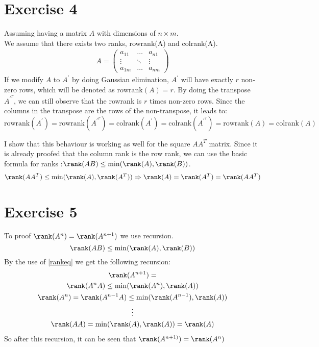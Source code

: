 \section{Exercise 4}
Assuming having a matrix $A$ with dimensions of $n\times m$.\\
We assume that there exists two ranks, rowrank(A) and colrank(A).
\begin{gather*}
A = \left( \begin{array}{ccc}
a_{11} & \hdots & a_{n1} \\
\vdots & \ddots & \vdots \\
a_{1m} & \hdots & a_{nm}
\end{array} \right)
\end{gather*}
If we modify $A$ to $A^{'}$ by doing Gaussian elimination, $A^{'}$ will have exactly $r$ non-zero rows, which will be denoted as $\text{rowrank}(A) = r$. 
By doing the transpose $A^{{'}^T}$, we can still observe that the rowrank is $r$ times non-zero rows. Since the columns in the transpose are the rows of the non-transpose, it leads to:
\begin{equation*}
\text{rowrank}(A^{'}) = \text{rowrank}(A^{{'}^T}) = \text{colrank}(A^{'}) = \text{colrank}(A^{{'}^T}) = \text{rowrank}(A) = \text{colrank} (A)
\end{equation*}

I show that this behaviour is working as well for the square $AA^T$ matrix. Since it is already proofed that the column rank is the row rank, we can use the basic formula for ranks :$\rank(AB) \leq \min(\rank (A), \rank(B))$.
\begin{equation}
\rank(A A^T) \leq \min( \rank (A) , \rank (A^T)) \Rightarrow \rank (A)=\rank (A^T)= \rank (A A^T)
\end{equation}

\section{Exercise 5}
To proof $\rank (A^n) = \rank (A^{n+1})$  we use recursion. 
\begin{equation}
\label{rankeq}
\rank (AB) \leq \min (\rank (A), \rank (B))
\end{equation}
By the use of \ref{rankeq} we get the following recursion:
\begin{gather*}
\rank (A^{n+1}) = \\ 
\rank (A^{n} A) \leq \min ( \rank (A^n), \rank(A) ) \\
\rank (A^n) = \rank (A^{n-1} A) \leq \min ( \rank (A^{n-1}), \rank(A) ) \\
\vdots \\
\rank(A A) = \min ( \rank (A), \rank(A) ) = \rank(A)
\end{gather*}
So after this recursion, it can be seen that $\rank (A^{n+1)}) = \rank (A^{n})$
